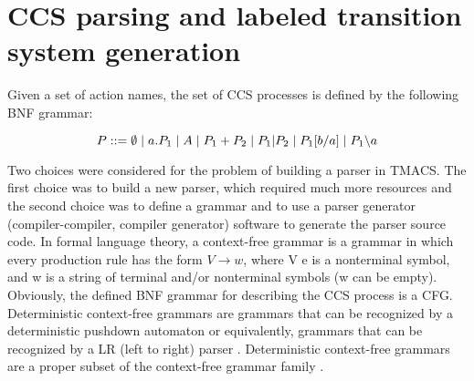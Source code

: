 \section{CCS parsing and labeled transition system generation}
\label{sec:parsing}

Given a set of action names, the set of CCS processes is defined by the following BNF grammar:

\begin{equation}\label{eq:ccs_bnf}
P ::= \emptyset \hspace{1 mm} | \hspace{1 mm} a.P_{1} \hspace{1 mm} | \hspace{1 mm} A \hspace{1 mm} | \hspace{1 mm}P_{1}+P_{2} \hspace{1 mm} |
\hspace{1 mm} P_{1} | P_{2} \hspace{1 mm} | \hspace{1 mm} P_{1}[b/a] \hspace{1 mm} | \hspace{1 mm} P_{1} \backslash a
\end{equation}

Two choices were considered for the problem of building a parser in TMACS. The first choice was to build
a new parser, which required much more resources and the second choice was to define a grammar
and to use a parser generator (compiler-compiler, compiler generator) software to generate the parser source code.
In formal language theory, a context-free grammar \cite{Chomsky} is a grammar in which every production 
rule has the form 
$V \rightarrow w$,
where V e is a nonterminal symbol, and w is a string of terminal and/or nonterminal symbols 
(w can be empty). Obviously, the defined BNF grammar for describing the CCS process is a CFG. 
Deterministic context-free grammars \cite{Chomsky} are grammars that can be recognized by a 
deterministic pushdown automaton or equivalently, grammars that can be recognized by a LR (left to right) 
parser \cite{Compilers}. Deterministic context-free grammars are a proper subset of the context-free grammar 
family \cite{Chomsky}. %

